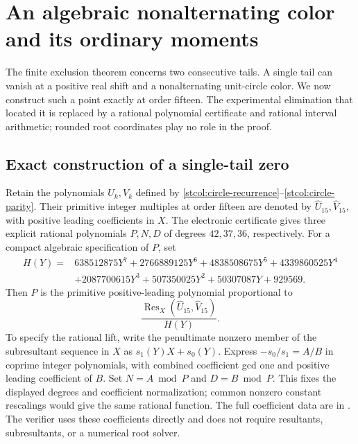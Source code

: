 \section{An algebraic nonalternating color and its ordinary moments}
\label{stalg:section}

The finite exclusion theorem concerns two consecutive tails.  A single
tail can vanish at a positive real shift and a nonalternating unit-circle
color.  We now construct such a point exactly at order fifteen.  The
experimental elimination that located it is replaced by a rational
polynomial certificate and rational interval arithmetic; rounded root
coordinates play no role in the proof.

\subsection{Exact construction of a single-tail zero}

Retain the polynomials $U_k,V_k$ defined by
\eqref{stcol:circle-recurrence}--\eqref{stcol:circle-parity}.
Their primitive integer multiples at order fifteen are denoted by
$\widehat U_{15},\widehat V_{15}$, with positive leading coefficients
in $X$.  The electronic certificate gives three explicit rational
polynomials $P,N,D$ of degrees $42,37,36$, respectively.
For a compact algebraic specification of $P$, set
\begin{align*}
 H(Y)={}&638512875Y^7+2766889125Y^6+4838508675Y^5
           +4339860525Y^4\\
       &+2087700615Y^3+507350025Y^2+50307087Y+929569.
\end{align*}
Then $P$ is the primitive positive-leading polynomial proportional to
\[
 \frac{\operatorname{Res}_X(\widehat U_{15},\widehat V_{15})}{H(Y)}.
\]
To specify the rational lift, write the penultimate nonzero member of
the subresultant sequence in $X$ as $s_1(Y)X+s_0(Y)$.
Express $-s_0/s_1=A/B$ in coprime integer polynomials, with combined
coefficient gcd one and positive leading coefficient of $B$.
Set $N=A\bmod P$ and $D=B\bmod P$.  This fixes the displayed degrees
and coefficient normalization; common nonzero constant rescalings
would give the same rational function.
The full coefficient data are in
.
The verifier uses these coefficients directly and does not require
resultants, subresultants, or a numerical root solver.

